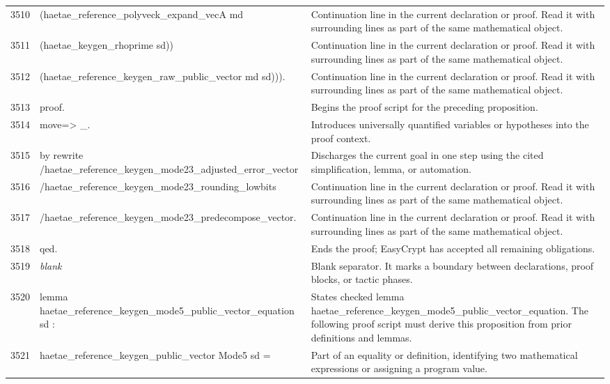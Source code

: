 \documentclass[10pt]{article}
\begin{document}
\begin{longtable}{r L{0.53\textwidth} L{0.37\textwidth}}
3510 & {\ttfamily\scriptsize         (haetae\_reference\_polyveck\_expand\_vecA md} & Continuation line in the current declaration or proof.  Read it with surrounding lines as part of the same mathematical object. \\
3511 & {\ttfamily\scriptsize           (haetae\_keygen\_rhoprime sd))} & Continuation line in the current declaration or proof.  Read it with surrounding lines as part of the same mathematical object. \\
3512 & {\ttfamily\scriptsize         (haetae\_reference\_keygen\_raw\_public\_vector md sd))).} & Continuation line in the current declaration or proof.  Read it with surrounding lines as part of the same mathematical object. \\
3513 & {\ttfamily\scriptsize proof.} & Begins the proof script for the preceding proposition. \\
3514 & {\ttfamily\scriptsize move=> \_.} & Introduces universally quantified variables or hypotheses into the proof context. \\
3515 & {\ttfamily\scriptsize by rewrite /haetae\_reference\_keygen\_mode23\_adjusted\_error\_vector} & Discharges the current goal in one step using the cited simplification, lemma, or automation. \\
3516 & {\ttfamily\scriptsize            /haetae\_reference\_keygen\_mode23\_rounding\_lowbits} & Continuation line in the current declaration or proof.  Read it with surrounding lines as part of the same mathematical object. \\
3517 & {\ttfamily\scriptsize            /haetae\_reference\_keygen\_mode23\_predecompose\_vector.} & Continuation line in the current declaration or proof.  Read it with surrounding lines as part of the same mathematical object. \\
3518 & {\ttfamily\scriptsize qed.} & Ends the proof; EasyCrypt has accepted all remaining obligations. \\
3519 & {\ttfamily\scriptsize \emph{blank}} & Blank separator.  It marks a boundary between declarations, proof blocks, or tactic phases. \\
3520 & {\ttfamily\scriptsize lemma haetae\_reference\_keygen\_mode5\_public\_vector\_equation sd :} & States checked lemma haetae\_reference\_keygen\_mode5\_public\_vector\_equation.  The following proof script must derive this proposition from prior definitions and lemmas. \\
3521 & {\ttfamily\scriptsize   haetae\_reference\_keygen\_public\_vector Mode5 sd =} & Part of an equality or definition, identifying two mathematical expressions or assigning a program value. \\

\end{longtable}
\end{document}
